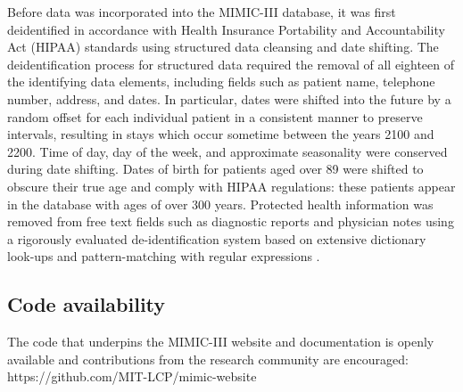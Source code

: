 \documentclass[english]{article}
\begin{document}
Before data was incorporated into the MIMIC-III database, it was first deidentified in accordance with Health Insurance Portability and Accountability Act (HIPAA) standards using structured data cleansing and date shifting. The deidentification process for structured data required the removal of all eighteen of the identifying data elements, including fields such as patient name, telephone number, address, and dates. In particular, dates were shifted into the future by a random offset for each individual patient in a consistent manner to preserve intervals, resulting in stays which occur sometime between the years 2100 and 2200. Time of day, day of the week, and approximate seasonality were conserved during date shifting. Dates of birth for patients aged over 89 were shifted to obscure their true age and comply with HIPAA regulations: these patients appear in the database with ages of over 300 years. Protected health information was removed from free text fields such as diagnostic reports and physician notes using a rigorously evaluated de-identification system based on extensive dictionary look-ups and pattern-matching with regular expressions \cite{cite5}.

\subsection*{Code availability}




The code that underpins the MIMIC-III website and documentation is openly available and contributions from the research community are encouraged: \\ https://github.com/MIT-LCP/mimic-website
\end{document}

